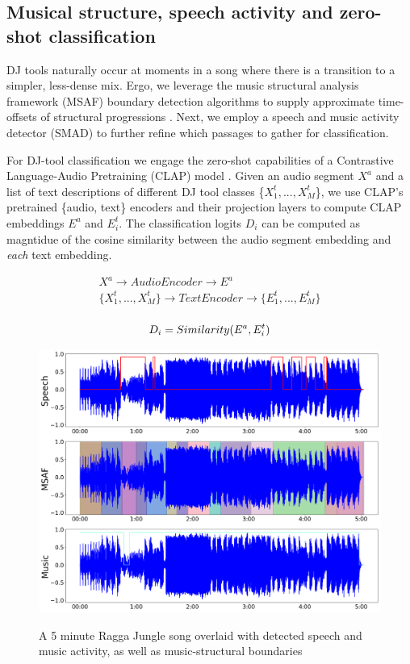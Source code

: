 \documentclass{article}
\begin{document}
\subsection{Musical structure, speech activity and zero-shot classification}\label{sec:djtool_classes}
DJ tools naturally occur at moments in a song where there is a transition to a simpler, less-dense mix. Ergo, we leverage the music structural analysis framework (MSAF) boundary detection algorithms to supply approximate time-offsets of structural progressions \cite{nieto2016systematic}. Next, we employ a speech and music activity detector (SMAD)\cite{Hung2022} to further refine which passages to gather for classification.

For DJ-tool classification we engage the zero-shot capabilities of a Contrastive Language-Audio Pretraining (CLAP) model \cite{elizalde2022claplearningaudioconcepts}. Given an audio segment $X^{a}$ and a list of text descriptions of different DJ tool classes \{$X^{t}_{1},...,X^{t}_{M}$\}, we use CLAP's pretrained \{audio, text\} encoders and their projection layers to compute CLAP embeddings $E^a$ and $E^t_i$. The classification logits $D_i$ can be computed as magntidue of the cosine similarity between the audio segment embedding and \textit{each} text embedding.

\begin{equation}
\begin{matrix}
    X^{a} \rightarrow AudioEncoder \rightarrow E^{a} \\ 
    \{X^{t}_{1},...,X^{t}_{M}\} \rightarrow TextEncoder \rightarrow \{E^{t}_{1},...,E^{t}_{M}\} \\ 
\end{matrix}
\end{equation}

\begin{equation}
    D_i = Similarity(E^a, E^{t}_{i}) \\ 
\end{equation}


\begin{figure}
 \centerline{
 	\includegraphics[alt={SMAD \& MSAF Analysis signals},width=0.9\columnwidth]{smad_msaf.png}}
 \caption{A 5 minute Ragga Jungle song overlaid with detected speech and music activity, as well as music-structural boundaries}
 \label{fig:msafsmadplot}
\end{figure}
\end{document}
